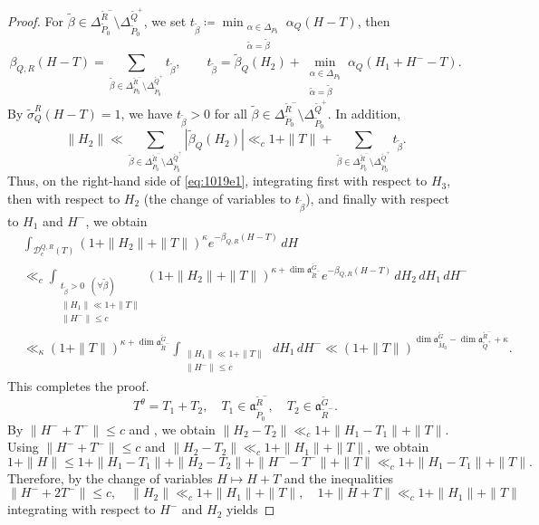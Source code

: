 \documentclass[12pt]{amsart}
\theoremstyle{definition}
\theoremstyle{plain}
\theoremstyle{remark}
\newcommand{\fa}{\mathfrak{a}}
\newcommand{\cD}{\mathcal{D}}
\numberwithin{equation}{section}
\newcommand{\tG}{\widetilde{G}}
\newcommand{\tM}{\widetilde{M}}
\newcommand{\tP}{\widetilde{P}}
\newcommand{\tQ}{\widetilde{Q}}
\newcommand{\tR}{\widetilde{R}}
\newcommand{\talpha}{\widetilde{\alpha}}
\newcommand{\tbeta}{\widetilde{\beta}}
\begin{document}
\begin{proof}
For $\tbeta\in \Delta_{\tP_0}^{\tR^-}\setminus\Delta_{\tP_0}^{\tQ^+}$, we set $t_{\tbeta}\coloneqq \min_{\substack{\alpha\in\Delta_{P_0}\\ \talpha=\tbeta}} \alpha_{Q}(H-T)$, then
\[
\beta_{Q,R}(H-T)=\sum_{\tbeta\in
       \Delta_{\tP_0}^{\tR^-}\setminus\Delta_{\tP_0}^{\tQ^+}}t_{\tbeta} , \qquad t_{\tbeta}=\tbeta_Q(H_2)+\min_{\substack{\alpha\in\Delta_{P_0}\\ \talpha=\tbeta}}\alpha_Q(H_1+H^- -T).
\]
By $\widetilde\sigma_Q^R(H-T)=1$, we have $t_{\tbeta}>0$ for all $\tbeta\in \Delta_{\tP_0}^{\tR^-}\setminus\Delta_{\tP_0}^{\tQ^+}$. 
In addition,
\[
\|H_2\|\ll \sum_{\tbeta\in\Delta_{\tP_0}^{\tR^-}\setminus\Delta_{\tP_0}^{\tQ^+}}|\tbeta_Q(H_2)|\ll_c 1+\|T\|+\sum_{\tbeta\in\Delta_{\tP_0}^{\tR^-}\setminus\Delta_{\tP_0}^{\tQ^+}} t_{\tbeta}.
\]
Thus, on the right-hand side of \eqref{eq:1019e1}, integrating first with respect to $H_3$, then with respect to $H_2$ (the change of variables to $t_{\tbeta}$), and finally with respect to $H_1$ and $H^-$, we obtain
\begin{align*}
& \int_{\cD_c^{Q,R}(T)}
       (1+\|H_2\|+\|T\|)^{\kappa} e^{-\beta_{Q,R}(H-T)}\,dH  \\
&\ll_{c} \int_{\substack{t_{\tbeta}>0 \;\; (\forall \tbeta)\\ \|H_1\|\ll 1+\|T\|\\ \|H^-\|\le c}}
       (1+\|H_2\|+\|T\|)^{\kappa+\dim\fa_{\tR^-}^{\tG}} e^{-\beta_{Q,R}(H-T)}\,dH_2\, dH_1\, dH^- \\
& \ll_\kappa (1+\|T\|)^{\kappa+\dim\fa_{\tR^-}^{\tG}}  \int_{\substack{\|H_1\|\ll 1+\|T\|\\ \|H^-\|\le c}} \, dH_1\, dH^-\ll (1+\|T\|)^{\dim \fa_{\tM_0}^{\tG}-\dim\fa_{\tQ^+}^{\tR^-}+\kappa}.        
\end{align*}
This completes the proof.
\[
T^{\theta}=T_1+T_2, \quad T_1\in \fa_{\tP_0}^{\tR^-}, \quad T_2\in\fa_{\tR^-}^{\tG}.
\]
By $\|H^- + T^-\|\le c$ and , we obtain $\|H_2-T_2\|\ll_c 1+\|H_1-T_1\|+\|T\|$.
Using $\|H^- + T^-\|\le c$ and $\|H_2-T_2\|\ll_c 1+\|H_1\|+\|T\|$, we obtain
\[
1+\|H\|\le 1+\| H_1-T_1\|+\| H_2-T_2\|+\|H^--T^-\|+\|T\|\ll_c 1+\|H_1-T_1\|+\|T\|.
\]
Therefore, by the change of variables $H\mapsto H+T$ and the inequalities 
\[
\|H^- + 2T^-\|\le c,\quad \|H_2\|\ll_c 1+\|H_1\|+\|T\|, \quad 1+\|H+T\|\ll_c 1+\|H_1\|+\|T\|
\]
integrating with respect to $H^-$ and $H_2$ yields

\end{proof}
\end{document}
